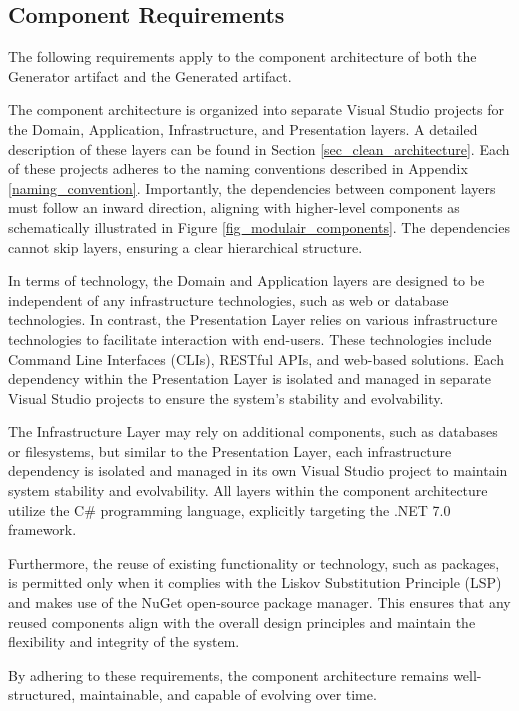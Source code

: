 \subsection{Component Requirements} \label{component_requirements}

The following requirements apply to the component architecture of both the Generator
artifact and the Generated artifact.

The component architecture is organized into separate Visual Studio projects for the
Domain, Application, Infrastructure, and Presentation layers. A detailed description of
these layers can be found in Section \ref{sec_clean_architecture}. Each of these projects adheres to
the naming conventions described in Appendix \ref{naming_convention}. Importantly, the
dependencies between component layers must follow an inward direction, aligning with
higher-level components as schematically illustrated in Figure
\ref{fig_modulair_components}. The dependencies cannot skip layers, ensuring a clear
hierarchical structure.

In terms of technology, the Domain and Application layers are designed to be independent
of any infrastructure technologies, such as web or database technologies. In contrast, the
Presentation Layer relies on various infrastructure technologies to facilitate interaction
with end-users. These technologies include Command Line Interfaces (CLIs), RESTful APIs,
and web-based solutions. Each dependency within the Presentation Layer is isolated and
managed in separate Visual Studio projects to ensure the system's stability and
evolvability.

The Infrastructure Layer may rely on additional components, such as databases or
filesystems, but similar to the Presentation Layer, each infrastructure dependency is
isolated and managed in its own Visual Studio project to maintain system stability and
evolvability. All layers within the component architecture utilize the C\# programming
language, explicitly targeting the .NET 7.0 framework.

Furthermore, the reuse of existing functionality or technology, such as packages, is
permitted only when it complies with the Liskov Substitution Principle (LSP) and makes use
of the NuGet open-source package manager. This ensures that any reused components align
with the overall design principles and maintain the flexibility and integrity of the
system.

By adhering to these requirements, the component architecture remains well-structured,
maintainable, and capable of evolving over time.
